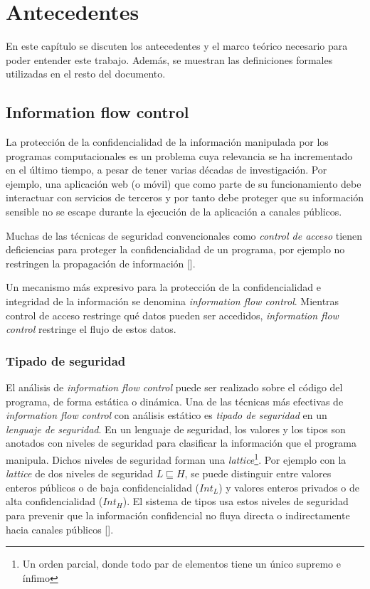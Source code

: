 \chapter{Antecedentes}

En este capítulo se discuten los antecedentes y el marco teórico necesario para poder entender este trabajo. Además, se muestran las definiciones formales utilizadas en el resto del documento.

\section{Information flow control}

	La protección de la confidencialidad de la información manipulada por los programas computacionales es un problema cuya relevancia se ha incrementado en el último tiempo, a pesar de tener varias décadas de investigación. Por ejemplo, una aplicación web (o móvil) que como parte de su funcionamiento debe interactuar con servicios de terceros y por tanto debe proteger que su información sensible no se escape durante la ejecución de la aplicación a canales públicos.

	Muchas de las técnicas de seguridad convencionales como \textit{control de acceso} tienen deficiencias para proteger la confidencialidad de un programa, por ejemplo no restringen la propagación de información [].%

	Un mecanismo más expresivo para la protección de la confidencialidad e integridad de la información se denomina \textit{information flow control}. Mientras control de acceso restringe qué datos pueden ser accedidos, \textit{information flow control} restringe el flujo de estos datos.

	\subsection{Tipado de seguridad}
	El análisis de \textit{information flow control} puede ser realizado sobre el código del programa, de forma estática o dinámica. Una de las técnicas más efectivas de \textit{information flow control} con análisis estático es \textit{tipado de seguridad} en un \textit{lenguaje de seguridad}. En un lenguaje de seguridad, los valores y los tipos son anotados con niveles de seguridad para clasificar la información que el programa manipula. Dichos niveles de seguridad forman una \textit{lattice}\footnote{Un orden parcial, donde todo par de elementos tiene un único supremo e ínfimo}. Por ejemplo con la \textit{lattice} de dos niveles de seguridad $L \sqsubseteq H$, se puede distinguir entre valores enteros públicos o de baja confidencialidad ($Int_L$) y valores enteros privados o de alta confidencialidad ($Int_H$). El sistema de tipos usa estos niveles de seguridad para prevenir que la información confidencial no fluya directa o indirectamente hacia canales públicos []. %


